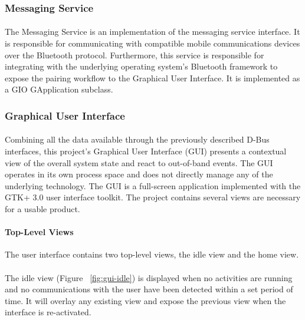 \subsubsection{Messaging Service}

\paragraph{}
The Messaging Service is an implementation of the messaging service interface.
It is responsible for communicating with compatible mobile communications devices over the Bluetooth protocol.
Furthermore, this service is responsible for integrating with the underlying operating system's Bluetooth framework to expose the pairing workflow to the Graphical User Interface.
It is implemented as a GIO GApplication subclass.

\subsubsection{Graphical User Interface}

\paragraph{}
Combining all the data available through the previously described D-Bus interfaces, this project's Graphical User Interface (GUI) presents a contextual view of the overall system state and react to out-of-band events.
The GUI operates in its own process space and does not directly manage any of the underlying technology.
The GUI is a full-screen application implemented with the GTK+ 3.0 user interface toolkit.
The project contains several views are necessary for a usable product.

\paragraph{Top-Level Views}
The user interface contains two top-level views, the idle view and the home view.

\paragraph{}
The idle view (Figure ~\ref{fig:gui-idle}) is displayed when no activities are running and no communications with the user have been detected within a set period of time.
It will overlay any existing view and expose the previous view when the interface is re-activated.

